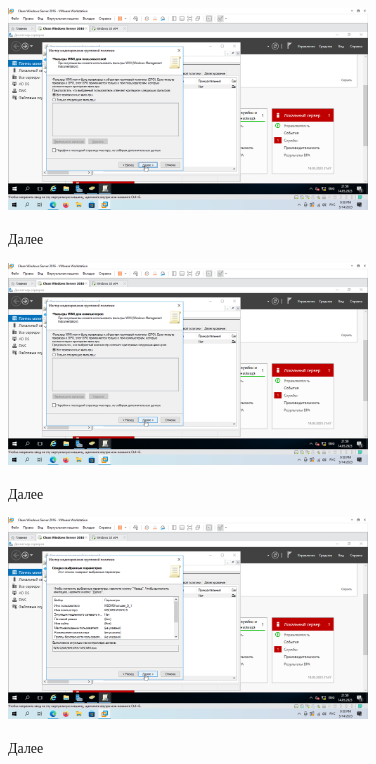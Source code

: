 \documentclass[a4paper]{article}
\begin{document}
  \begin{figure}[H]
    \centering
    \includegraphics[width=0.85\textwidth]{5_0129}
    \label{img:129}
    \caption{Далее}
  \end{figure}

  \begin{figure}[H]
    \centering
    \includegraphics[width=0.85\textwidth]{5_0130}
    \label{img:130}
    \caption{Далее}
  \end{figure}

  \begin{figure}[H]
    \centering
    \includegraphics[width=0.85\textwidth]{5_0131}
    \label{img:131}
    \caption{Далее}
  \end{figure}
\end{document}
